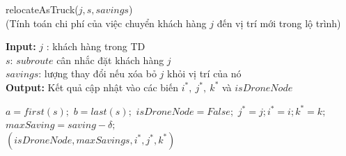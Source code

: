 \documentclass[a4paper,12pt]{report}
\begin{document}
\begin{algorithm}[H]
\caption{relocateAsTruck($j,s,savings$)\\(Tính toán chi phí của việc chuyển khách hàng $j$ đến vị trí mới trong lộ trình)}
\textbf{Input:} $j$ : khách hàng trong TD\\ $s$: $subroute$ cân nhắc đặt khách hàng $j$ \\ $savings$: lượng thay đổi nếu xóa bỏ $j$ khỏi vị trí của nó\\
\textbf{Output:} Kết quả cập nhật vào các biến $i^*, \ j^*, \ k^*$ và $isDroneNode$
\begin{algorithmic}[1]
\State $a=first(s);$
\State $b=last(s);$
\State $isDroneNode=False;$
\State $j^*=j;i^*=i;k^*=k;$
\State $maxSaving=saving-\delta;$
\EndIf
\EndIf
\EndIf
\EndIf
\EndFor\\
\Return 	$(isDroneNode,maxSavings,i^*,j^*,k^*)$
\end{algorithmic}

\label{alg:tspls3}
\end{algorithm}
\end{document}
